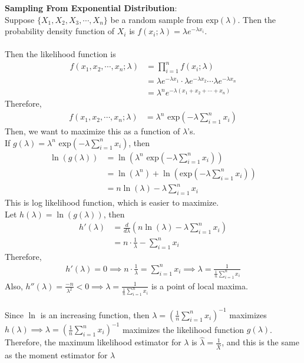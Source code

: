 \begin{ex}
\textbf{Sampling From Exponential Distribution}:\\
Suppose $\{X_1,X_2,X_3,\cdots,X_n\}$ be a random sample from $\text{exp}(\lambda)$. Then the probability density function of $X_i$ is $f(x_i;\lambda)=\lambda e^{-\lambda x_i}$.\\
\hfill\\
Then the likelihood function is \begin{align*}
f(x_1,x_2,\cdots,x_n;\lambda)&=\prod_{i=1}^n f(x_i;\lambda)\\
&=\lambda e^{-\lambda x_1}\cdot \lambda e^{-\lambda x_2}\cdots \lambda e^{-\lambda x_n}\\
&=\lambda^n e^{-\lambda(x_1+x_2+\cdots+x_n)}
\end{align*}
Therefore, \begin{align*}
f(x_1,x_2,\cdots,x_n;\lambda)&=\lambda^n \text{ exp}(-\lambda \sum_{i=1}^nx_i)
\end{align*}
Then, we want to maximize this as a function of $\lambda$'s. \\
If $g(\lambda)=\lambda^n \text{ exp}(-\lambda \sum_{i=1}^nx_i)$, then \begin{align*}
\ln(g(\lambda))&=\ln(\lambda^n\text{ exp}(-\lambda \sum_{i=1}^nx_i))\\
&=\ln(\lambda^n)+\ln(\text{exp}(-\lambda\sum_{i=1}^nx_i))\\
&=n\ln (\lambda)-\lambda\sum_{i=1}^n x_i
\end{align*}
This is log likelihood function, which is easier to maximize.\\
Let $h(\lambda)=\ln (g(\lambda))$, then \begin{align*}
h'(\lambda)&=\frac{d}{d\lambda}\left(n\ln (\lambda)-\lambda \sum_{i=1}^n x_i \right)\\
&=n\cdot  \frac{1}{\lambda}-\sum_{i=1}^n x_i
\end{align*} 
Therefore, \begin{align*}
h'(\lambda)=0\implies n\cdot \frac{1}{\lambda}=\sum_{i=1}^n x_i\implies \lambda =\frac{1}{\frac{1}{n}\sum_{i=1}^n x_i}
\end{align*}
Also, $h''(\lambda)=\frac{-n}{\lambda^2}<0\implies \lambda =\frac{1}{\frac{1}{n}\sum_{i=1}^n x_i}$ is a point of local maxima.\\
\hfill\\
Since $\ln$ is an increasing function, then $\lambda =\left(\frac{1}{n}\sum_{i=1}^nx_i \right)^{-1}$ maximizes $h(\lambda)\implies \lambda = \left(\frac{1}{n}\sum_{i=1}^nx_i \right)^{-1}$ maximizes the likelihood function $g(\lambda)$. Therefore, the maximum likelihood estimator for $\lambda$ is $\widehat{\lambda}=\frac{1}{\overline{X}}$, and this is the same as the moment estimator for $\lambda$
\end{ex}
